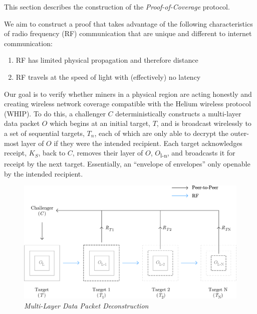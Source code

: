 \documentclass[letterpaper,11pt]{article}
\begin{document}
This section describes the construction of the \emph{Proof-of-Coverage} protocol.

We aim to construct a proof that takes advantage of the following characteristics of radio frequency (RF) communication that are unique and different to internet communication:

\begin{enumerate}
    \item RF has limited physical propagation and therefore distance
    \item RF travels at the speed of light with (effectively) no latency
\end{enumerate}

Our goal is to verify whether miners in a physical region are acting honestly and creating wireless network coverage compatible with the Helium wireless protocol (WHIP). To do this, a challenger $C$ deterministically constructs a multi-layer data packet $O$ which begins at an initial target, $T$, and is broadcast wirelessly to a set of sequential targets, $T_n$, each of which are only able to decrypt the outer-most layer of $O$ if they were the intended recipient. Each target acknowledges receipt, $K_S$, back to $C$, removes their layer of $O$, $O$\textsubscript{l-n}, and broadcasts it for receipt by the next target. Essentially, an ``envelope of envelopes'' only openable by the intended recipient.

\begin{figure}[H]
    \begin{center}
          \includegraphics[width=\textwidth]{diagram2.eps}
          \caption{\emph{Multi-Layer Data Packet Deconstruction}}
          \label{fig:poc-construction}
     \end{center}
\end{figure}
\end{document}
